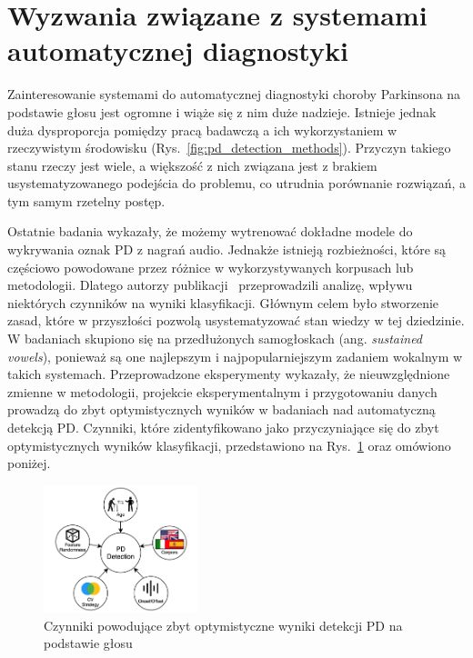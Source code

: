 \section{Wyzwania związane z systemami automatycznej diagnostyki}\label{sec:wyzwania}

Zainteresowanie systemami do automatycznej diagnostyki choroby Parkinsona na podstawie głosu jest ogromne i wiąże się z nim duże nadzieje.
Istnieje jednak duża dysproporcja pomiędzy pracą badawczą a ich wykorzystaniem w rzeczywistym środowisku (Rys.~\ref{fig:pd_detection_methods}).
Przyczyn takiego stanu rzeczy jest wiele, a większość z nich związana jest z brakiem usystematyzowanego podejścia do problemu, co utrudnia porównanie
rozwiązań, a tym samym rzetelny postęp.

Ostatnie badania wykazały, że możemy wytrenować dokładne modele do wykrywania oznak PD z nagrań audio.
Jednakże istnieją rozbieżności, które są częściowo powodowane przez różnice w
wykorzystywanych korpusach lub metodologii.
Dlatego autorzy publikacji~\cite{SustainedVowelsProblems} przeprowadzili analizę, wpływu niektórych czynników na wyniki klasyfikacji.
Głównym celem było stworzenie zasad, które w przyszłości pozwolą usystematyzować stan wiedzy w tej dziedzinie.
W badaniach skupiono się na przedłużonych samogłoskach (ang. \emph{sustained vowels}), ponieważ są one najlepszym i najpopularniejszym zadaniem
wokalnym w takich systemach.
Przeprowadzone eksperymenty wykazały, że nieuwzględnione zmienne w metodologii, projekcie eksperymentalnym i
przygotowaniu danych prowadzą do zbyt optymistycznych wyników w badaniach nad automatyczną detekcją PD\@.
Czynniki, które zidentyfikowano jako przyczyniające się do zbyt optymistycznych wyników klasyfikacji, przedstawiono na Rys.~\ref{fig:factors_PD_detection} oraz omówiono poniżej.


\begin{figure}[htbp]
	\centering
	\includegraphics[width=0.4\textwidth]{./img/influence_of_factors_on_PD_detection}
	\caption{Czynniki powodujące zbyt optymistyczne wyniki detekcji PD na podstawie głosu \cite {SustainedVowelsProblems}}
    \label{fig:factors_PD_detection}
\end{figure}



